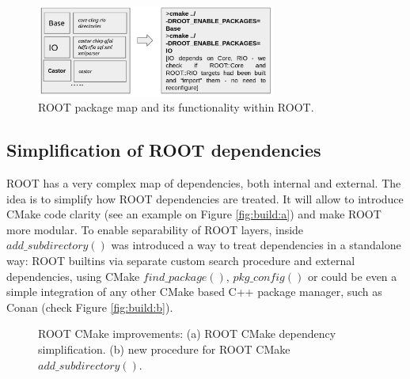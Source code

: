 \documentclass[12pt]{iopart}
\begin{document}
\begin{figure}[!h]
\centering
\includegraphics[width=0.7\textwidth]{root-pm-new.png}
\caption{ROOT package map and its functionality within ROOT.}
\label{packagemap}
\end{figure}

\subsection{Simplification of ROOT dependencies}

ROOT has a very complex map of dependencies, both internal and external. The idea is to simplify how ROOT dependencies are treated. It will allow to introduce CMake code clarity (see an example on Figure \ref{fig:build:a}) and make ROOT more modular. To enable separability of ROOT layers, inside $add\_subdirectory()$ was introduced a way to treat dependencies in a standalone way: ROOT builtins via separate custom search procedure and external dependencies, using CMake $find\_package()$, $pkg\_config()$ or could be even a simple integration of any other CMake based C++ package manager, such as Conan \cite{conan} (check Figure \ref{fig:build:b}).

\begin{figure}
\centering
\begin{minipage}{\textwidth}
\begin{center}
\end{center}{}
\end{minipage}\hfill
\begin{minipage}{\textwidth}
\begin{center}
\end{center}{}
\end{minipage}
 \caption{ROOT CMake improvements: (a) ROOT CMake dependency simplification. (b) new procedure for ROOT CMake $add\_subdirectory()$.}
\label{fig:performance1}
\end{figure}
\end{document}

